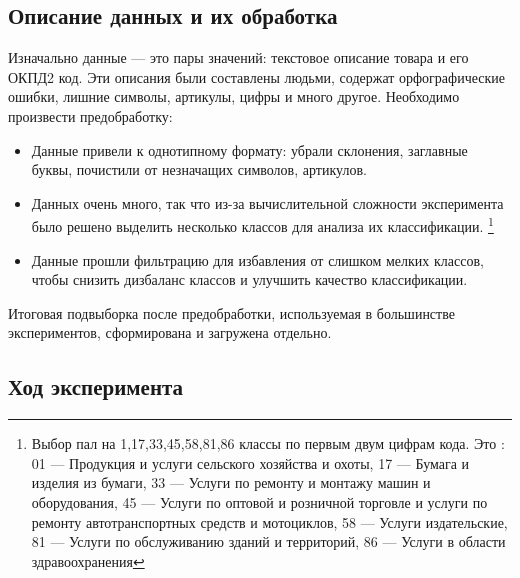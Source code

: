 \documentclass{article}
\begin{document}
\subsection{Описание данных и их обработка}
Изначально данные --- это пары значений: текстовое описание товара и его ОКПД2 код. Эти описания были составлены людьми, содержат орфографические ошибки, лишние символы, артикулы, цифры и много другое. Необходимо произвести предобработку:
\begin{itemize}
\item[\circ] Данные привели к однотипному формату: убрали склонения, заглавные буквы, почистили от незначащих символов, артикулов.%
\item[\circ] Данных очень много, так что из-за вычислительной сложности эксперимента было решено выделить несколько классов для анализа их классификации. \footnote{Выбор пал на 1,17,33,45,58,81,86 классы по первым двум цифрам кода. Это : 01 --- Продукция и услуги сельского хозяйства и охоты, 17 --- Бумага и изделия из бумаги, 33 --- Услуги по ремонту и монтажу машин и оборудования, 45 --- Услуги по оптовой и розничной торговле и услуги по ремонту автотранспортных средств и мотоциклов,  58 --- Услуги издательские,  81 --- Услуги по обслуживанию зданий и территорий, 86 --- Услуги в области здравоохранения}  
\item[\circ] Данные прошли фильтрацию для избавления от слишком мелких классов, чтобы снизить дизбаланс классов и улучшить качество классификации.
\end{itemize}
Итоговая подвыборка после предобработки, используемая в большинстве экспериментов, сформирована и загружена отдельно.%

\newpage
\subsection{Ход эксперимента}
\end{document}
